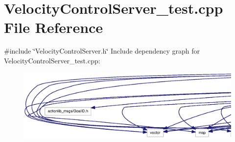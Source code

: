 \section{\-Velocity\-Control\-Server\-\_\-test.\-cpp \-File \-Reference}
\label{VelocityControlServer__test_8cpp}
{\ttfamily \#include \char`\"{}\-Velocity\-Control\-Server.\-h\char`\"{}}\*
\-Include dependency graph for \-Velocity\-Control\-Server\-\_\-test.\-cpp\-:
\nopagebreak
\begin{figure}[H]
\begin{center}
\leavevmode
\includegraphics[width=350pt]{VelocityControlServer__test_8cpp__incl}
\end{center}
\end{figure}
